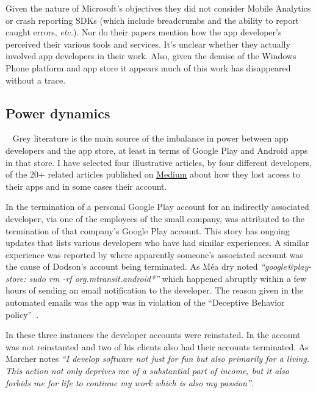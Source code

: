 Given the nature of Microsoft's objectives they did not consider Mobile Analytics or crash reporting SDKs (which include breadcrumbs and the ability to report caught errors, \emph{etc.}). Nor do their papers mention how the app developer's perceived their various tools and services. It's unclear whether they actually involved app developers in their work. Also, given the demise of the Windows Phone platform and app store it appears much of this work has disappeared without a trace.


\subsection{Power dynamics}~\label{rw-power-dynamics-topic}
Grey literature is the main source of the imbalance in power between app developers and the app store, at least in terms of Google Play and Android apps in that store. I have selected four illustrative articles, by four different developers, of the 20+ related articles published on \href{https://medium.com/}{Medium} %
about how they lost access to their apps and in some cases their account. 

In \textcite{martinez2019_google_just_terminated_our_startup_google_play_publisher_account_on_xmas_day} the termination of a personal Google Play account for an indirectly associated developer, via one of the employees of the small company, was attributed to the termination of that company's Google Play account. This story has ongoing updates that lists various developers who have had similar experiences. A similar experience was reported by \textcite{dodson2019_google_completely_terminated_our_new_business_etc} where apparently someone's associated account was the cause of Dodson's account being terminated. As Méa dry noted \emph{``google@play-store: sudo rm -rf org.mtransit.android*''} which happened abruptly within a few hours of sending an email notification to the developer. The reason given in the automated emails was the app was in violation of the ``Deceptive Behavior policy''~. 

In these three instances the developer accounts were reinstated. In \textcite{marcher2021_how_google_terminated-a-developer} the account was not reinstanted and two of his clients also had their accounts terminated. As Marcher notes \emph{``I develop software not just for fun but also primarily for a living. This action not only deprives me of a substantial part of income, but it also forbids me for life to continue my work which is also my passion''}. %

